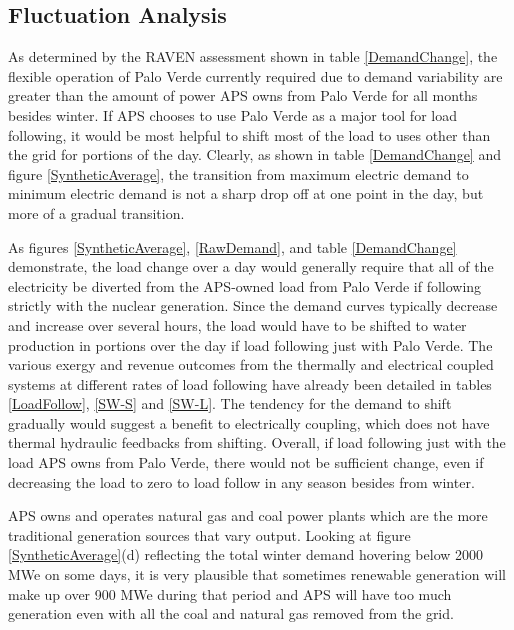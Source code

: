 \subsection{Fluctuation Analysis}

As determined by the RAVEN assessment shown in table \ref{DemandChange}, the flexible operation of Palo Verde currently required due to demand variability are greater than the amount of power APS owns from Palo Verde for all months besides winter.  If APS chooses to use Palo Verde as a major tool for load following, it would be most helpful to shift most of the load to uses other than the grid for portions of the day.  Clearly, as shown in table \ref{DemandChange} and figure \ref{SyntheticAverage}, the transition from maximum electric demand to minimum electric demand is not a sharp drop off at one point in the day, but more of a gradual transition.

As figures \ref{SyntheticAverage}, \ref{RawDemand}, and table \ref{DemandChange} demonstrate, the load change over a day would generally require that all of the electricity be diverted from the APS-owned load from Palo Verde if following strictly with the nuclear generation.  Since the demand curves typically decrease and increase over several hours, the load would have to be shifted to water production in portions over the day if load following just with Palo Verde.  The various exergy and revenue outcomes from the thermally and electrical coupled systems at different rates of load following have already been detailed in tables \ref{LoadFollow}, \ref{SW-S} and \ref{SW-L}. The tendency for the demand to shift gradually would suggest a benefit to electrically coupling, which does not have thermal hydraulic feedbacks from shifting. Overall, if load following just with the load APS owns from Palo Verde, there would not be sufficient change, even if decreasing the load to zero to load follow in any season besides from winter.

APS owns and operates natural gas and coal power plants which are the more traditional generation sources that vary output. Looking at figure \ref{SyntheticAverage}(d) reflecting the total winter demand hovering below 2000 MWe on some days, it is very plausible that sometimes renewable generation will make up over 900 MWe during that period and APS will have too much generation even with all the coal and natural gas removed from the grid.

